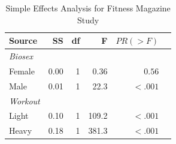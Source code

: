 \documentclass[onecolumn,10pt]{jhwhw}
\begin{document}
\begin{table}[htdp]
\begin{center}
\begin{tabular}{l r r r r r}
\toprule
Source & SS & df & F & $PR(>F)$ \\
\midrule
\it{Biosex} & & & & \\
\hspace{1em} Female     & 0.00 &  1  & 0.36 & $0.56$ \\
\hspace{1em} Male       & 0.01 &  1  & 22.3 & $<.001$\\
\it{Workout} & & & & \\
\hspace{1em} Light      & 0.10 &  1  & 109.2 & $<.001$\\
\hspace{1em} Heavy      & 0.18 &  1  & 381.3 & $<.001$\\
\bottomrule
\end{tabular}
\end{center}
\caption{Simple Effects Analysis for Fitness Magazine Study}
\end{table}
\end{document}
